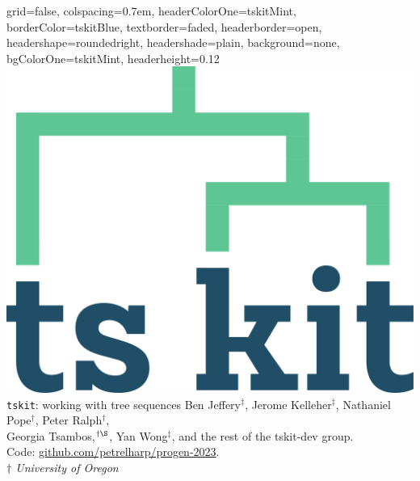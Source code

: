 \documentclass[landscape,a0paper,fontscale=0.292]{baposter}
\newcommand{\tskit}{{\texttt{tskit}}}
\begin{document}
\begin{poster}{
 grid=false,
 colspacing=0.7em,
 headerColorOne=tskitMint,
 borderColor=tskitBlue,
 textborder=faded,
 headerborder=open,
 headershape=roundedright,
 headershade=plain,
 background=none,
 bgColorOne=tskitMint,
 headerheight=0.12\textheight}
 { \includegraphics[height=0.12\textheight]{tskit_logo}
 }
 {\Huge \tskit{}: \sc working with tree sequences}
  {\sf %
    Ben Jeffery${}^\ddagger$,
    Jerome Kelleher$^{\ddagger}$,
    Nathaniel Pope${}^\dagger$,
    Peter Ralph${}^\dagger$,
    \\  \vspace{-1.0mm}
    Georgia Tsambos,${}^{\dagger\S}$,
    Yan Wong$^{\ddagger}$,
    and the rest of the tskit-dev group.
    \\  \vspace{-1.0mm}
    Code: \url{github.com/petrelharp/progen-2023}. 
    \\  \vspace{-1.0mm}
    {\small \textit{$\dagger$ University of Oregon} } %
}
\end{poster}
\end{document}
